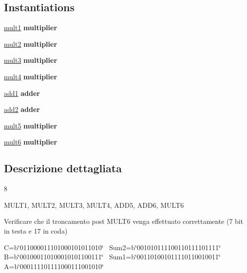 \subsection*{Instantiations}
 \begin{DoxyCompactItemize}
\item 
\hyperlink{class_linear_regression_1_1_structural_abe2dbada52541335e367815bffe06c28}{mult1}  {\bfseries multiplier}   
\item 
\hyperlink{class_linear_regression_1_1_structural_a7c5c7b6fb03b66e49b0eb767162f01a8}{mult2}  {\bfseries multiplier}   
\item 
\hyperlink{class_linear_regression_1_1_structural_adf80c8ef67f9eb716830cfb9a6d3a980}{mult3}  {\bfseries multiplier}   
\item 
\hyperlink{class_linear_regression_1_1_structural_a65ae62ab3b1e6675bf4e4bcf572d2025}{mult4}  {\bfseries multiplier}   
\item 
\hyperlink{class_linear_regression_1_1_structural_adea88291834bfbc1cfe284774c792d37}{add1}  {\bfseries adder}   
\item 
\hyperlink{class_linear_regression_1_1_structural_a09e3b860880a85f376374594ffd092fb}{add2}  {\bfseries adder}   
\item 
\hyperlink{class_linear_regression_1_1_structural_aed551c15ed15fe4ab7d0c073a7e33b9c}{mult5}  {\bfseries multiplier}   
\item 
\hyperlink{class_linear_regression_1_1_structural_afa25d32bbc0881baaa179e393e1964c5}{mult6}  {\bfseries multiplier}   
\end{DoxyCompactItemize}


\subsection{Descrizione dettagliata}
8 

M\+U\+L\+T1, M\+U\+L\+T2, M\+U\+L\+T3, M\+U\+L\+T4, A\+D\+D5, A\+D\+D6, M\+U\+L\+T6 

Verificare che il troncamento post M\+U\+L\+T6 venga effettuato correttamente (7 bit in testa e 17 in coda) 

C=b\char`\"{}011000011101000101011010\char`\"{}~\newline
 Sum2=b\char`\"{}001010111100110111101111\char`\"{}~\newline
 B=b\char`\"{}001000110100010101100111\char`\"{}~\newline
 Sum1=b\char`\"{}001101001011110110010011\char`\"{}~\newline
 A=b\char`\"{}000111101111000111001010\char`\"{}  

